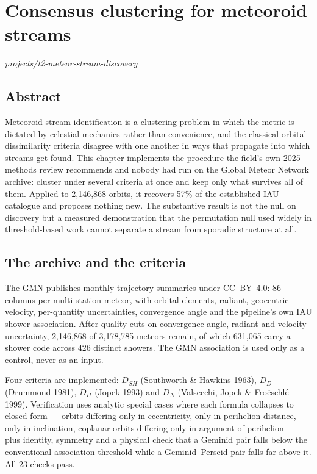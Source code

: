 \documentclass[11pt,a4paper]{report}
\begin{document}
\chapter{Consensus clustering for meteoroid streams}
\label{ch:t2}
\noindent\textit{projects/t2-meteor-stream-discovery}

\section*{Abstract}

Meteoroid stream identification is a clustering problem in which the metric is dictated by
celestial mechanics rather than convenience, and the classical orbital dissimilarity criteria
disagree with one another in ways that propagate into which streams get found. This chapter
implements the procedure the field's own 2025 methods review recommends and nobody had run on
the Global Meteor Network archive: cluster under several criteria at once and keep only what
survives all of them. Applied to 2{,}146{,}868 orbits, it recovers 57\% of the established IAU
catalogue and proposes nothing new. The substantive result is not the null on discovery but a
measured demonstration that the permutation null used widely in threshold-based work cannot
separate a stream from sporadic structure at all.

\section{The archive and the criteria}

The GMN publishes monthly trajectory summaries under CC~BY~4.0: 86 columns per multi-station
meteor, with orbital elements, radiant, geocentric velocity, per-quantity uncertainties,
convergence angle and the pipeline's own IAU shower association. After quality cuts on
convergence angle, radiant and velocity uncertainty, 2{,}146{,}868 of 3{,}178{,}785 meteors
remain, of which 631{,}065 carry a shower code across 426 distinct showers. The GMN
association is used only as a control, never as an input.

Four criteria are implemented: $D_{SH}$ (Southworth \& Hawkins 1963), $D_D$ (Drummond 1981),
$D_H$ (Jopek 1993) and $D_N$ (Valsecchi, Jopek \& Fro\"eschl\'e 1999). Verification uses
analytic special cases where each formula collapses to closed form --- orbits differing only
in eccentricity, only in perihelion distance, only in inclination, coplanar orbits differing
only in argument of perihelion --- plus identity, symmetry and a physical check that a Geminid
pair falls below the conventional association threshold while a Geminid--Perseid pair falls far
above it. All 23 checks pass.
\end{document}
